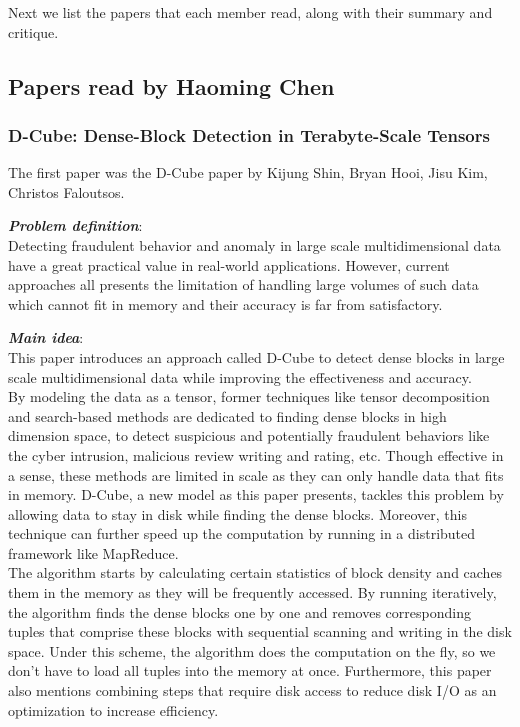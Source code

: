 Next we list the papers that each member read,
along with their summary and critique.

\subsection{Papers read by Haoming Chen}
\subsubsection{D-Cube: Dense-Block Detection in Terabyte-Scale Tensors} 
The first paper was the D-Cube paper by Kijung Shin, Bryan Hooi, Jisu Kim, Christos Faloutsos.\cite{shin2017d} 
\begin{itemize*}
\item {\em \textbf{Problem definition}}: \\
Detecting fraudulent behavior and anomaly in large scale multidimensional data have a great practical value in real-world applications. However, current approaches all presents the limitation of handling large volumes of such data which cannot fit in memory and their accuracy is far from satisfactory. \\ 

\item {\em \textbf{Main idea}}: \\
This paper introduces an approach called D-Cube to detect dense blocks in large scale multidimensional data while improving the effectiveness and accuracy. \\

By modeling the data as a tensor, former techniques like tensor decomposition and search-based methods are dedicated to finding dense blocks in high dimension space, to detect suspicious and potentially fraudulent behaviors like the cyber intrusion, malicious review writing and rating, etc. Though effective in a sense, these methods are limited in scale as they can only handle data that fits in memory. D-Cube, a new model as this paper presents, tackles this problem by allowing data to stay in disk while finding the dense blocks. Moreover, this technique can further speed up the computation by running in a distributed framework like MapReduce.\\

The algorithm starts by calculating certain statistics of block density and caches them in the memory as they will be frequently accessed. By running iteratively, the algorithm finds the dense blocks one by one and removes corresponding tuples that comprise these blocks with sequential scanning and writing in the disk space. Under this scheme, the algorithm does the computation on the fly, so we don’t have to load all tuples into the memory at once. Furthermore, this paper also mentions combining steps that require disk access to reduce disk I/O as an optimization to increase efficiency. \\ 


\end{itemize*}
